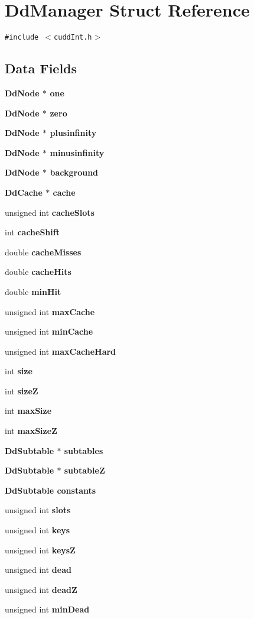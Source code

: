\section{Dd\-Manager Struct Reference}
\label{structDdManager}
{\tt \#include $<$cudd\-Int.h$>$}

\subsection*{Data Fields}
\begin{CompactItemize}
\item 
\bf{Dd\-Node} $\ast$ \bf{one}
\item 
\bf{Dd\-Node} $\ast$ \bf{zero}
\item 
\bf{Dd\-Node} $\ast$ \bf{plusinfinity}
\item 
\bf{Dd\-Node} $\ast$ \bf{minusinfinity}
\item 
\bf{Dd\-Node} $\ast$ \bf{background}
\item 
\bf{Dd\-Cache} $\ast$ \bf{cache}
\item 
unsigned int \bf{cache\-Slots}
\item 
int \bf{cache\-Shift}
\item 
double \bf{cache\-Misses}
\item 
double \bf{cache\-Hits}
\item 
double \bf{min\-Hit}
\item 
unsigned int \bf{max\-Cache}
\item 
unsigned int \bf{min\-Cache}
\item 
unsigned int \bf{max\-Cache\-Hard}
\item 
int \bf{size}
\item 
int \bf{size\-Z}
\item 
int \bf{max\-Size}
\item 
int \bf{max\-Size\-Z}
\item 
\bf{Dd\-Subtable} $\ast$ \bf{subtables}
\item 
\bf{Dd\-Subtable} $\ast$ \bf{subtable\-Z}
\item 
\bf{Dd\-Subtable} \bf{constants}
\item 
unsigned int \bf{slots}
\item 
unsigned int \bf{keys}
\item 
unsigned int \bf{keys\-Z}
\item 
unsigned int \bf{dead}
\item 
unsigned int \bf{dead\-Z}
\item 
unsigned int \bf{min\-Dead}

\end{CompactItemize}
